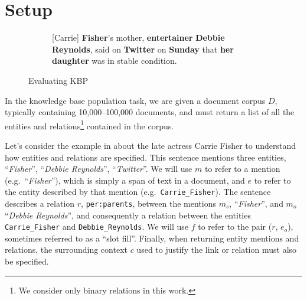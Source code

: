 \section{Setup}
\label{sec:setup}


\begin{figure*}[ht]
  \centering
  \begin{subfigure}{0.49\textwidth}
    [Carrie] \textbf{Fisher}’s mother, \textbf{entertainer} \textbf{Debbie Reynolds}, said on \textbf{Twitter} on \textbf{Sunday} that \textbf{her daughter} was in stable condition.
  \end{subfigure}
  \hfill
  \begin{subfigure}{0.49\textwidth}
  
  \end{subfigure}
  \caption{Evaluating KBP }
\end{figure*}

In the knowledge base population task,
 we are given a document corpus $D$, typically containing 10,000--100,000 documents,
 and must return a list of all the entities and relations\footnote{
 We consider only binary relations in this work.
 } contained in the corpus.

Let's consider the example in  about the late actress Carrie Fisher to understand how entities and relations are specified.
This sentence mentions three entities,
  ``\textit{Fisher}'',
  ``\textit{Debbie Reynolds}'',
  ``\textit{Twitter}''.
We will use $m$ to refer to a mention (e.g.\ ``\textit{Fisher}''), which is simply a span of text in a document, and $e$ to refer to the entity described by that mention (e.g.\ \texttt{Carrie\_Fisher}).
The sentence describes a relation $r$, \texttt{per:parents}, between the mentions $m_s$, ``\textit{Fisher}'', and $m_o$ ``\textit{Debbie Reynolds}'', and consequently a relation between the entities \texttt{Carrie\_Fisher} and \texttt{Debbie\_Reynolds}.
We will use $f$ to refer to the pair ($r$, $e_o$), sometimes referred to as a ``slot fill''.
Finally, when returning entity mentions and relations, the surrounding context $c$  used to justify the link or relation must also be specified.

